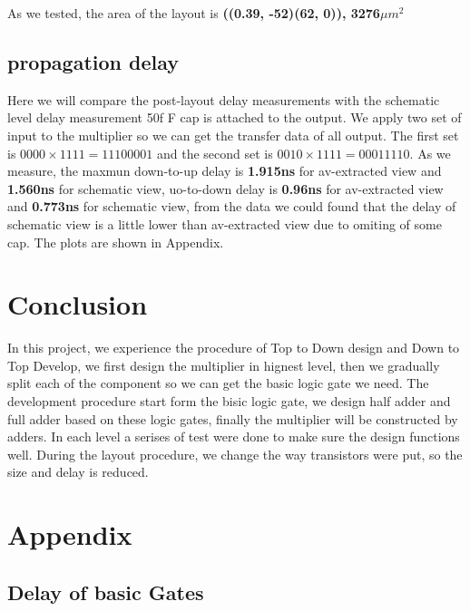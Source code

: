 \documentclass[conference]{IEEEtran}
\begin{document}
As we tested, the area of the layout is \textbf{((0.39, -52)(62, 0)), 3276$\mu m^2$}

\subsection{propagation delay}

Here we will compare the post-layout delay measurements with the schematic level delay measurement 50f F cap is attached to the output. We apply two set of input to the multiplier so we can get the transfer data of all output. The first set is $0000 \times 1111 = 11100001$ and the second set is $0010 \times 1111 = 00011110$. As we measure, the maxmun down-to-up delay is \textbf{1.915ns} for av-extracted view and \textbf{1.560ns} for schematic view, uo-to-down delay is \textbf{0.96ns} for av-extracted view and \textbf{0.773ns} for schematic view, from the data we could found that the delay of schematic view is a little lower than av-extracted view due to omiting of some cap. The plots are shown in Appendix.

\section{Conclusion}

In this project, we experience the procedure of Top to Down design and Down to Top Develop, we first design the multiplier in hignest level, then we gradually split each of the component so we can get the basic logic gate we need. The development procedure start form the bisic logic gate, we design half adder and full adder based on these logic gates, finally the multiplier will be constructed by adders. In each level a serises of test were done to make sure the design functions well. During the layout procedure, we change the way transistors were put, so the size and delay is reduced.


% 




\newpage
\section{Appendix}

\subsection{Delay of basic Gates}

\end{document}
